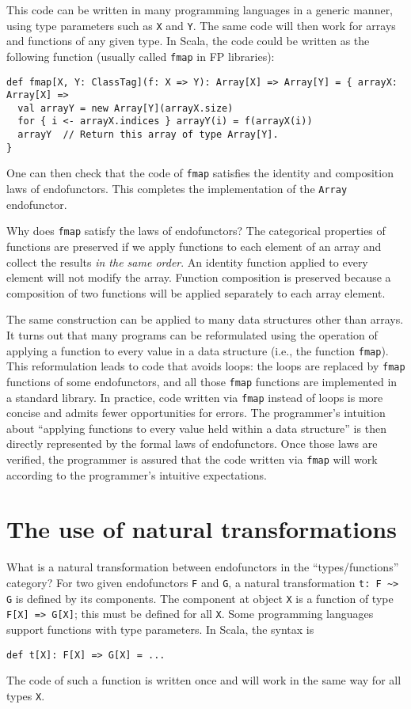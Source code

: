 This code can be written in many programming languages in a generic
manner, using type parameters such as \lstinline!X! and \lstinline!Y!.
The same code will then work for arrays and functions of any given
type. In Scala, the code could be written as the following function
(usually called \lstinline!fmap! in FP libraries):
\begin{lstlisting}
def fmap[X, Y: ClassTag](f: X => Y): Array[X] => Array[Y] = { arrayX: Array[X] =>
  val arrayY = new Array[Y](arrayX.size)
  for { i <- arrayX.indices } arrayY(i) = f(arrayX(i))
  arrayY  // Return this array of type Array[Y].
}
\end{lstlisting}
One can then check that the code of \lstinline!fmap! satisfies the
identity and composition laws of endofunctors. This completes the
implementation of the \lstinline!Array! endofunctor.

Why does \lstinline!fmap! satisfy the laws of endofunctors? The categorical
properties of functions are preserved if we apply functions to each
element of an array and collect the results \emph{in the same order}.
An identity function applied to every element will not modify the
array. Function composition is preserved because a composition of
two functions will be applied separately to each array element.

The same construction can be applied to many data structures other
than arrays. It turns out that many programs can be reformulated using
the operation of applying a function to every value in a data structure
(i.e., the function \lstinline!fmap!). This reformulation leads to
code that avoids loops: the loops are replaced by \lstinline!fmap!
functions of some endofunctors, and all those \lstinline!fmap! functions
are implemented in a standard library. In practice, code written via
\lstinline!fmap! instead of loops is more concise and admits fewer
opportunities for errors. The programmer\textsf{'}s intuition about \textsf{``}applying
functions to every value held within a data structure\textsf{''} is then directly
represented by the formal laws of endofunctors. Once those laws are
verified, the programmer is assured that the code written via \lstinline!fmap!
will work according to the programmer\textsf{'}s intuitive expectations.

\section{The use of natural transformations}

What is a natural transformation between endofunctors in the \textsf{``}types/functions\textsf{''}
category? For two given endofunctors \lstinline!F! and \lstinline!G!,
a natural transformation \lstinline!t: F ~> G! is defined by its
components. The component at object \lstinline!X! is a function of
type \lstinline!F[X] => G[X]!; this must be defined for all \lstinline!X!.
Some programming languages support functions with type parameters.
In Scala, the syntax is
\begin{lstlisting}
def t[X]: F[X] => G[X] = ...
\end{lstlisting}
The code of such a function is written once and will work in the same
way for all types \lstinline!X!.


